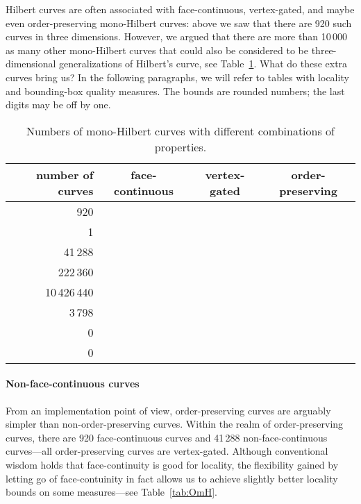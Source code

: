 \documentclass[11pt,a4paper]{article}
\begin{document}
\bigskip
Hilbert curves are often associated with face-continuous, vertex-gated, and maybe even order-preserving mono-Hilbert curves: above we saw that there are 920 such curves in three dimensions. However, we argued that there are more than 10\,000 as many other mono-Hilbert curves that could also be considered to be three-dimensional generalizations of Hilbert's curve, see Table~\ref{tab:extracurves}.
What do these extra curves bring us? In the following paragraphs, we will refer to tables with locality and bounding-box quality measures. The bounds are rounded numbers; the last digits may be off by one.

\begin{table}
\centering
\begin{tabular}{r|ccc}
number of curves & face-continuous & vertex-gated & order-preserving \\
\hline
             920 &        &     &         \\
               1 &        &              &                  \\
         41\,288 &                 &     &         \\
\hline
        222\,360 &        &     &                  \\
    10\,426\,440 &                 &     &                  \\
          3\,798 &                 &              &                  \\
\hline
               0 &        &              &         \\
               0 &                 &              &         \\
\end{tabular}
\caption{Numbers of mono-Hilbert curves with different combinations of properties.}
\label{tab:extracurves}
\end{table}

\paragraph{Non-face-continuous curves}
From an implementation point of view, order-preserving curves are arguably simpler than non-order-preserving curves. Within the realm of order-preserving curves, there are 920 face-continuous curves and 41\,288 non-face-continuous curves---all order-preserving curves are vertex-gated. Although conventional wisdom holds that face-continuity is good for locality, the flexibility gained by letting go of face-contuinity in fact allows us to achieve slightly better locality bounds on some measures---see Table~\ref{tab:OmH}.
\end{document}
